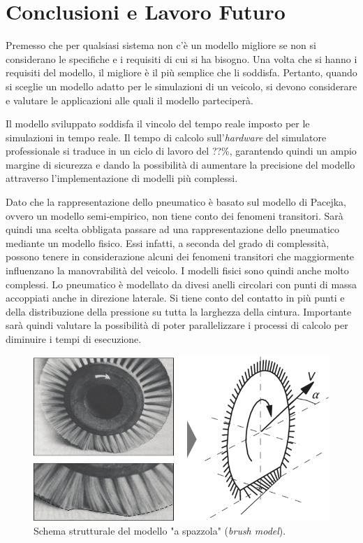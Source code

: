 \chapter{Conclusioni e Lavoro Futuro}
\label{Conclusione}
%
Premesso che per qualsiasi sistema non c'è un modello migliore se non si considerano le specifiche e i requisiti di cui si ha bisogno. Una volta che si hanno i requisiti del modello, il migliore è il più semplice che li soddisfa. Pertanto, quando si sceglie un modello adatto per le simulazioni di un veicolo, si devono considerare e valutare le applicazioni alle quali il modello parteciperà.

Il modello sviluppato soddisfa il vincolo del tempo reale imposto per le simulazioni in tempo reale. Il tempo di calcolo sull'\textit{hardware} del simulatore professionale si traduce in un ciclo di lavoro del ??\%, garantendo quindi un ampio margine di sicurezza e dando la possibilità di aumentare la precisione del modello attraverso l'implementazione di modelli più complessi.

Dato che la rappresentazione dello pneumatico è basato sul modello di Pacejka, ovvero un modello semi-empirico, non tiene conto dei fenomeni transitori. Sarà quindi una scelta obbligata passare ad una rappresentazione dello pneumatico mediante un modello fisico. Essi infatti, a seconda del grado di complessità, possono tenere in considerazione alcuni dei fenomeni transitori che maggiormente influenzano la manovrabilità del veicolo. I modelli fisici sono quindi anche molto complessi. Lo pneumatico è modellato da divesi anelli circolari con punti di massa accoppiati anche in direzione laterale. Si tiene conto del contatto in più punti e della distribuzione della pressione su tutta la larghezza della cintura. Importante sarà quindi valutare la possibilità di poter parallelizzare i processi di calcolo per diminuire i tempi di esecuzione.

\begin{figure}
	\centering
	\includegraphics[width=0.7\linewidth]{Figures/brush_model}
	\caption{Schema strutturale del modello "a spazzola" (\textit{brush model}). }
	\label{brushmodel}
\end{figure}

